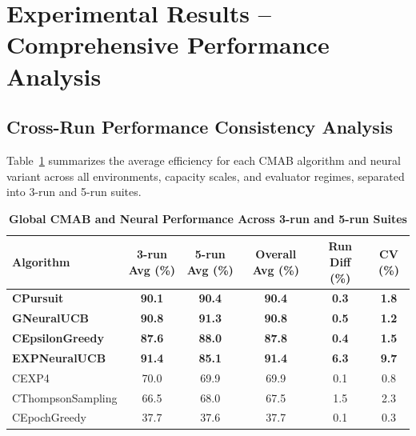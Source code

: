 \documentclass[12pt,a4paper]{article}
\newcommand{\performance}[1]{\textcolor{performancecolor}{\textbf{#1}}}
\newcommand{\legacy}[1]{\textcolor{legacycolor}{\textbf{#1}}}
\newcommand{\neural}[1]{\textcolor{neuralcolor}{\textbf{#1}}}
\begin{document}
\section{Experimental Results – Comprehensive Performance Analysis}

\begin{tcolorbox}[colback=performancecolor!10,colframe=performancecolor,title=\textbf{Primary Performance Results (Aggregated Across Capacities, Environments, and Regimes)}]
\small
\subsection{Cross-Run Performance Consistency Analysis}

Table~\ref{tab:global-performance} summarizes the average efficiency for each CMAB algorithm and neural variant across all environments, capacity scales, and evaluator regimes, separated into 3-run and 5-run suites.

\begin{table}[H]
\small
\centering
\caption{\performance{Global CMAB and Neural Performance Across 3-run and 5-run Suites}}
\label{tab:global-performance}
\begin{tabular}{|l|c|c|c|c|c|}
\hline
\textbf{Algorithm} & \textbf{3-run Avg (\%)} & \textbf{5-run Avg (\%)} & \textbf{Overall Avg (\%)} & \textbf{Run Diff (\%)} & \textbf{CV (\%)} \\
\hline
\hline
\performance{CPursuit}        & \performance{90.1} & \performance{90.4} & \performance{90.4} & \performance{0.3} & \performance{1.8} \\
\neural{GNeuralUCB}          & \neural{90.8} & \neural{91.3} & \neural{90.8} & \neural{0.5} & \neural{1.2} \\
\performance{CEpsilonGreedy} & \performance{87.6} & \performance{88.0} & \performance{87.8} & \performance{0.4} & \performance{1.5} \\
\legacy{EXPNeuralUCB}        & \legacy{91.4}     & \legacy{85.1}     & \legacy{91.4} & \legacy{6.3} & \legacy{9.7} \\
CEXP4                        & 70.0              & 69.9              & 69.9 & 0.1 & 0.8 \\
CThompsonSampling            & 66.5              & 68.0              & 67.5 & 1.5 & 2.3 \\
CEpochGreedy                 & 37.7              & 37.6              & 37.7 & 0.1 & 0.3 \\
\hline
\end{tabular}
\end{table}


\end{tcolorbox}
\end{document}
